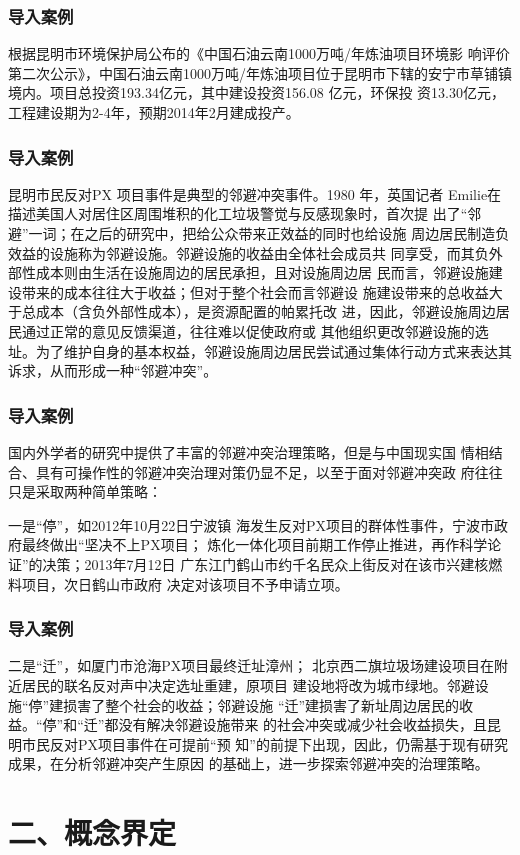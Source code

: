 \documentclass[aspectratio=169, 12pt]{beamer}
\begin{document}
\begin{frame}[plain]
    \frametitle{导入案例}
    根据昆明市环境保护局公布的《中国石油云南1000万吨/年炼油项目环境影
响评价第二次公示》，中国石油云南1000万吨/年炼油项目位于昆明市下辖的安宁市草铺镇境内。项目总投资193.34亿元，其中建设投资156.08 亿元，环保投
资13.30亿元，工程建设期为2-4年，预期2014年2月建成投产。
\end{frame}

\begin{frame}[plain]
    \frametitle{导入案例}
    昆明市民反对PX 项目事件是典型的邻避冲突事件。1980 年，英国记者
Emilie在描述美国人对居住区周围堆积的化工垃圾警觉与反感现象时，首次提
出了“邻避”一词；在之后的研究中，把给公众带来正效益的同时也给设施
周边居民制造负效益的设施称为邻避设施。邻避设施的收益由全体社会成员共
同享受，而其负外部性成本则由生活在设施周边的居民承担，且对设施周边居
民而言，邻避设施建设带来的成本往往大于收益；但对于整个社会而言邻避设
施建设带来的总收益大于总成本（含负外部性成本），是资源配置的帕累托改
进，因此，邻避设施周边居民通过正常的意见反馈渠道，往往难以促使政府或
其他组织更改邻避设施的选址。为了维护自身的基本权益，邻避设施周边居民尝试通过集体行动方式来表达其诉求，从而形成一种“邻避冲突”。
\end{frame}

\begin{frame}[plain]
    \frametitle{导入案例}
    国内外学者的研究中提供了丰富的邻避冲突治理策略，但是与中国现实国
情相结合、具有可操作性的邻避冲突治理对策仍显不足，以至于面对邻避冲突政
府往往只是采取两种简单策略：
\par
一是“停”，如2012年10月22日宁波镇
海发生反对PX项目的群体性事件，宁波市政府最终做出“坚决不上PX项目；
炼化一体化项目前期工作停止推进，再作科学论证”的决策；2013年7月12日
广东江门鹤山市约千名民众上街反对在该市兴建核燃料项目，次日鹤山市政府
决定对该项目不予申请立项。
\end{frame}

\begin{frame}[plain]
    \frametitle{导入案例}
    二是“迁”，如厦门市沧海PX项目最终迁址漳州；
北京西二旗垃圾场建设项目在附近居民的联名反对声中决定选址重建，原项目
建设地将改为城市绿地。邻避设施“停”建损害了整个社会的收益；邻避设施
“迁”建损害了新址周边居民的收益。“停”和“迁”都没有解决邻避设施带来
的社会冲突或减少社会收益损失，且昆明市民反对PX项目事件在可提前“预
知”的前提下出现，因此，仍需基于现有研究成果，在分析邻避冲突产生原因
的基础上，进一步探索邻避冲突的治理策略。
\end{frame}

\section{二、概念界定}
\end{document}

